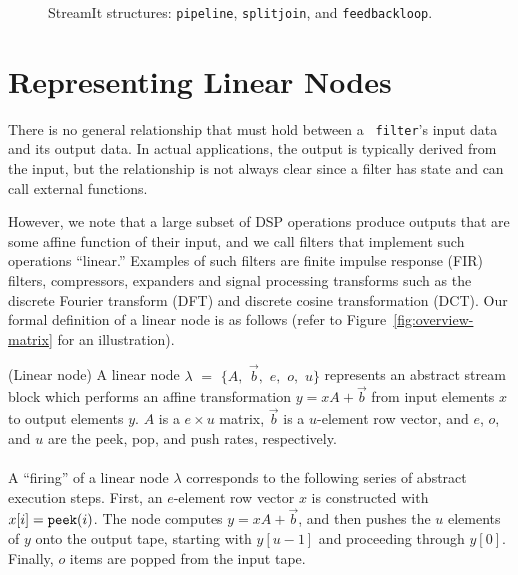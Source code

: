 \begin{figure}[t]
\vspace{-6pt}
\center
\epsfxsize=3.0in
\vspace{-12pt}
\caption{StreamIt structures: {\tt pipeline}, {\tt splitjoin}, and {\tt feedbackloop}.
\protect\label{fig:structures}}
\vspace{-12pt}
\end{figure}

\section{Representing Linear Nodes}
\label{sec:linearrep}

There is no general relationship that must hold between a {\tt
filter}'s input data and its output data. In actual applications, the
output is typically derived from the input, but the relationship is
not always clear since a filter has state and can call external
functions.

However, we note that a large subset of DSP operations produce outputs
that are some affine function of their input, and we call
filters that implement such operations ``linear.''  Examples of such
filters are finite impulse response (FIR) filters, compressors,
expanders and signal processing transforms such as the discrete
Fourier transform (DFT) and discrete cosine transformation (DCT).  Our
formal definition of a linear node is as follows (refer to
Figure~\ref{fig:overview-matrix} for an illustration). \vspace{-4pt}
\begin{definition}(Linear node)
A linear node $\lambda$ $=$ $\{A,$ ${\vec b},$ $e,$ $o,$ $u\}$
represents an abstract stream block which performs an affine
transformation $y = x A + {\vec b}$ from input elements $x$ to output
elements $y$.  $A$ is a $e \times u$ matrix, ${\vec b}$ is a
$u$-element row vector, and $e$, $o$, and $u$ are the peek, pop, and
push rates, respectively. \\ ~ \vspace{-8pt} \\
%
A ``firing'' of a linear node $\lambda$ corresponds to the following
series of abstract execution steps.  First, an $e$-element row vector
$x$ is constructed with $x[i] = \mbox{\tt peek}(i)$.  The node
computes $y = x A + {\vec b}$, and then pushes the $u$ elements of $y$ onto
the output tape, starting with $y[u-1]$ and proceeding through $y[0]$.
Finally, $o$ items are popped from the input tape.
\end{definition} \vspace{-2pt}

